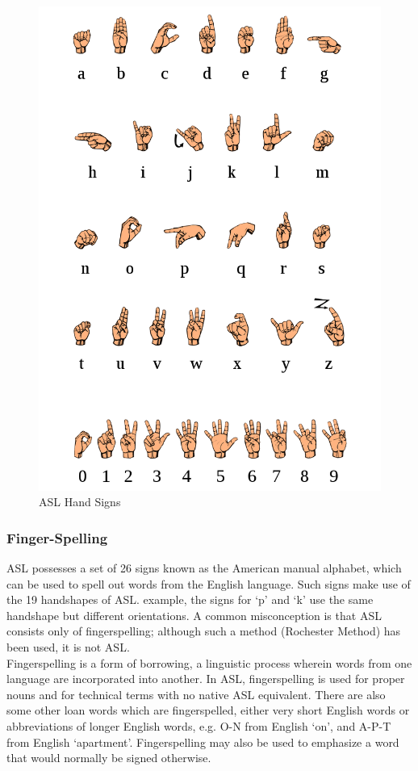 \documentclass[14pt]{report}
\begin{document}
				\begin{figure}[h]
					\includegraphics[width=12cm]{ASL Signs.png}
					\centering
					\caption{ASL Hand Signs}
				\end{figure}

				\subsubsection{Finger-Spelling}
					ASL possesses a set of 26 signs known as the American manual alphabet, which can be used to spell out words from the English language. Such signs make use of the 19 handshapes of ASL.  example, the signs for `p' and `k' use the same handshape but different orientations. A common misconception is that ASL consists only of fingerspelling; although such a method (Rochester Method) has been used, it is not ASL.\\

					Fingerspelling is a form of borrowing, a linguistic process wherein words from one language are incorporated into another. In ASL, fingerspelling is used for proper nouns and for technical terms with no native ASL equivalent. There are also some other loan words which are fingerspelled, either very short English words or abbreviations of longer English words, e.g. O-N from English `on', and A-P-T from English `apartment'. Fingerspelling may also be used to emphasize a word that would normally be signed otherwise.\\
				
\end{document}
